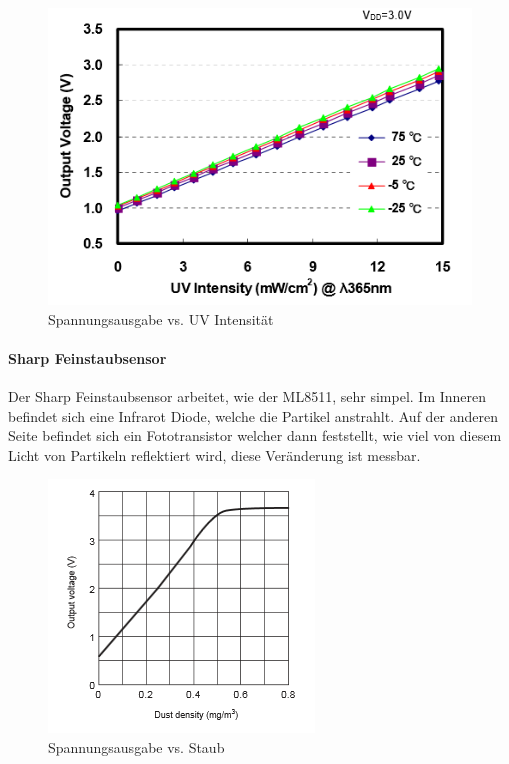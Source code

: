 \begin{figure}[h]
	\centering
	\includegraphics[scale=0.4]{2_Beschreibung_des_CANSAT/graph_photodiode_response.png}
	\caption{Spannungsausgabe vs. UV Intensität}
	\label{graph photodiode}
\end{figure}


\paragraph{Sharp Feinstaubsensor}
Der Sharp Feinstaubsensor arbeitet, wie der ML8511, sehr simpel. Im Inneren befindet sich eine Infrarot Diode, welche die Partikel anstrahlt. Auf der anderen Seite befindet sich ein Fototransistor welcher dann feststellt, wie viel von diesem Licht von Partikeln reflektiert wird, diese Veränderung ist messbar.

\begin{figure}[h]
	\centering
	\includegraphics[scale=0.5]{2_Beschreibung_des_CANSAT/graph_photodiode_sharp.png}
	\caption{Spannungsausgabe vs. Staub}
	\label{graph photodiode}
\end{figure}

